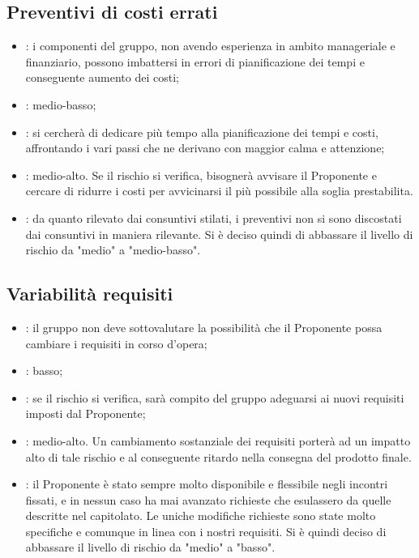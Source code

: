 \subsection{Preventivi di costi errati}
\begin{itemize}
\item {}: i componenti del gruppo, non avendo esperienza in ambito manageriale e finanziario, possono imbattersi in errori di pianificazione dei tempi e conseguente aumento dei costi;
\item {}: medio-basso;
\item {}: si cercherà di dedicare più tempo alla pianificazione dei tempi e costi, affrontando i vari passi che ne derivano con maggior calma e attenzione;
\item {}: medio-alto. Se il rischio si verifica, bisognerà avvisare il Proponente e cercare di ridurre i costi per avvicinarsi il più possibile alla soglia prestabilita.
\item {}: da quanto rilevato dai consuntivi stilati, i preventivi non si sono discostati dai consuntivi in maniera rilevante. Si è deciso quindi di abbassare il livello di rischio da "medio" a "medio-basso".
\end{itemize}

\subsection{Variabilità requisiti}
\begin{itemize}
\item {}: il gruppo non deve sottovalutare la possibilità che il Proponente possa cambiare i requisiti in corso d'opera;
\item {}: basso;
\item {}: se il rischio si verifica, sarà compito del gruppo adeguarsi ai nuovi requisiti imposti dal Proponente;
\item {}: medio-alto. Un cambiamento sostanziale dei requisiti porterà ad un impatto alto di tale rischio e al conseguente ritardo nella consegna del prodotto finale.
\item {}: il Proponente è stato sempre molto disponibile e flessibile negli incontri fissati, e in nessun caso ha mai avanzato richieste che esulassero da quelle descritte nel capitolato. Le uniche modifiche richieste sono state molto specifiche e comunque in linea con i nostri requisiti. Si è quindi deciso di abbassare il livello di rischio da "medio" a "basso".
\end{itemize}

